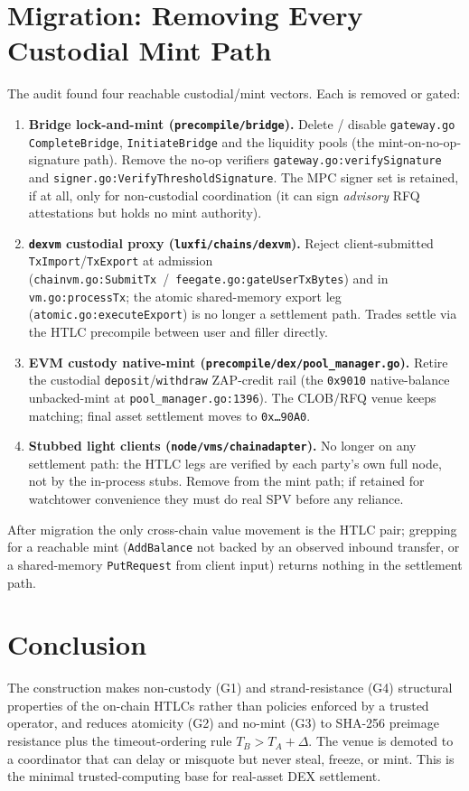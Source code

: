 \documentclass[11pt]{article}
\begin{document}
\section{Migration: Removing Every Custodial Mint Path}

The audit found four reachable custodial/mint vectors. Each is removed or gated:
\begin{enumerate}[leftmargin=2em]
  \item \textbf{Bridge lock-and-mint (\texttt{precompile/bridge}).} Delete /
        disable \texttt{gateway.go} \texttt{CompleteBridge}, \texttt{InitiateBridge}
        and the liquidity pools (the mint-on-no-op-signature path). Remove the
        no-op verifiers \texttt{gateway.go:verifySignature} and
        \texttt{signer.go:VerifyThresholdSignature}. The MPC signer set is
        retained, if at all, only for non-custodial coordination (it can sign
        \emph{advisory} RFQ attestations but holds no mint authority).
  \item \textbf{\texttt{dexvm} custodial proxy (\texttt{luxfi/chains/dexvm}).}
        Reject client-submitted \texttt{TxImport}/\texttt{TxExport} at admission
        (\texttt{chainvm.go:SubmitTx}~/~\texttt{feegate.go:gateUserTxBytes}) and
        in \texttt{vm.go:processTx}; the atomic shared-memory export leg
        (\texttt{atomic.go:executeExport}) is no longer a settlement path.
        Trades settle via the HTLC precompile between user and filler directly.
  \item \textbf{EVM custody native-mint (\texttt{precompile/dex/pool\_manager.go}).}
        Retire the custodial \texttt{deposit}/\texttt{withdraw} ZAP-credit rail
        (the \texttt{0x9010} native-balance unbacked-mint at
        \texttt{pool\_manager.go:1396}). The CLOB/RFQ venue keeps matching; final
        asset settlement moves to \texttt{0x{\dots}90A0}.
  \item \textbf{Stubbed light clients (\texttt{node/vms/chainadapter}).} No
        longer on any settlement path: the HTLC legs are verified by each party's
        own full node, not by the in-process stubs. Remove from the mint path;
        if retained for watchtower convenience they must do real SPV before any
        reliance.
\end{enumerate}
After migration the only cross-chain value movement is the HTLC pair; grepping
for a reachable mint (\texttt{AddBalance} not backed by an observed inbound
transfer, or a shared-memory \texttt{PutRequest} from client input) returns
nothing in the settlement path.

\section{Conclusion}
The construction makes non-custody (G1) and strand-resistance (G4) structural
properties of the on-chain HTLCs rather than policies enforced by a trusted
operator, and reduces atomicity (G2) and no-mint (G3) to SHA-256 preimage
resistance plus the timeout-ordering rule $T_B > T_A + \Delta$. The venue is
demoted to a coordinator that can delay or misquote but never steal, freeze, or
mint. This is the minimal trusted-computing base for real-asset DEX settlement.
\end{document}
